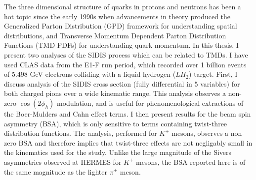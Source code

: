 The three dimensional structure of quarks in protons and neutrons has been a hot topic since the early 1990s when advancements in theory produced the Generalized Parton Distribution (GPD) framework for understanding spatial distributions, and Transverse Momentum Dependent Parton Distribution Functions (TMD PDFs) for understanding quark momentum.  In this thesis, I present two analyses of the SIDIS process which can be related to TMDs.  I have used CLAS data from the E1-F run period, which recorded over 1 billion events of 5.498 GeV electrons colliding with a liquid hydrogen ($LH_2$) target.  First, I discuss analysis of the SIDIS cross section (fully differential in 5 variables) for both charged pions over a wide kinematic range.  This analysis observes a non-zero $\cos(2\phi_h)$ modulation, and is useful for phenomenological extractions of the Boer-Mulders and Cahn effect terms.  I then present results for the beam spin asymmetry (BSA), which is only sensitive to terms containing twist-three distribution functions.  The analysis, performed for $K^+$ mesons, observes a non-zero BSA and therefore implies that twist-three effects are not negligably small in the kinematics used for the study.  Unlike the large magnitude of the Sivers asymmetries observed at HERMES for $K^+$ mesons, the BSA reported here is of the same magnitude as the lighter $\pi^+$ meson. 
